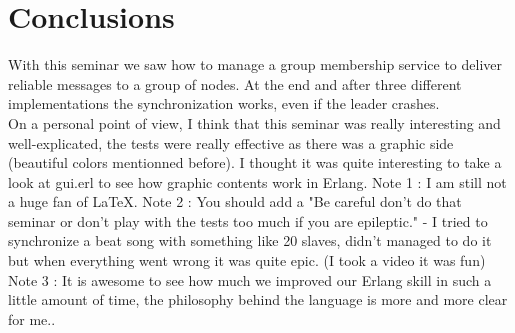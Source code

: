 \documentclass[a4paper, 11pt]{article}
\begin{document}
\section{Conclusions}

With this seminar we saw how to manage a group membership service to deliver reliable messages to a group of nodes. At the end and after three different implementations the synchronization works, even if the leader crashes.\\
On a personal point of view, I think that this seminar was really interesting and well-explicated, the tests were really effective as there was a graphic side (beautiful colors mentionned before). I thought it was quite interesting to take a look at gui.erl to see how graphic contents work in Erlang.
Note 1 : I am still not a huge fan of LaTeX.
Note 2 : You should add a "Be careful don't do that seminar or don't play with the tests too much if you are epileptic." - I tried to synchronize a beat song with something like 20 slaves, didn't managed to do it but when everything went wrong it was quite epic. (I took a video it was fun)
Note 3 : It is awesome to see how much we improved our Erlang skill in such a little amount of time, the philosophy behind the language is more and more clear for me..
\end{document}
